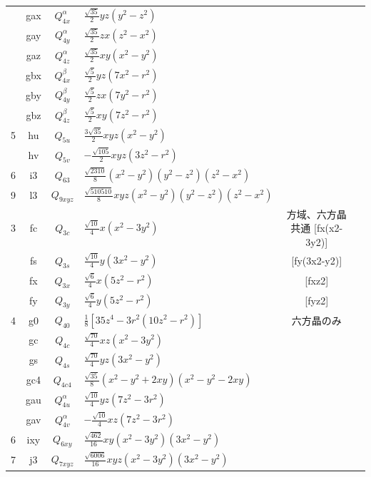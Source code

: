 \documentclass[11pt]{easymemo}
\begin{document}
\begin{table}[ht!]
\begin{center}
\begin{tabular}{ccclcc}
& gax & $Q_{4x}^\alpha$ & $\frac{\sqrt{35}}{2}yz(y^2-z^2)$ & \\
& gay & $Q_{4y}^\alpha$ & $\frac{\sqrt{35}}{2}zx(z^2-x^2)$ & \\
& gaz & $Q_{4z}^\alpha$ & $\frac{\sqrt{35}}{2}xy(x^2-y^2)$ & \\
& gbx & $Q_{4x}^\beta$ & $\frac{\sqrt{5}}{2}yz(7x^2-r^2)$ & \\
& gby & $Q_{4y}^\beta$ & $\frac{\sqrt{5}}{2}zx(7y^2-r^2)$ & \\
& gbz & $Q_{4z}^\beta$ & $\frac{\sqrt{5}}{2}xy(7z^2-r^2)$ & \\
5 & hu & $Q_{5u}$ & $\frac{3\sqrt{35}}{2}xyz(x^2-y^2)$ & \\
& hv & $Q_{5v}$ & $-\frac{\sqrt{105}}{2}xyz(3z^2-r^2)$ & \\
6 & i3 & $Q_{63}$ & $\frac{\sqrt{2310}}{8}(x^2-y^2)(y^2-z^2)(z^2-x^2)$ & \\
9 & l3 & $Q_{9xyz}$ & $\frac{\sqrt{510510}}{8}xyz(x^2-y^2)(y^2-z^2)(z^2-x^2)$ & \\ \hline
3 & fc & $Q_{3c}$ & $\frac{\sqrt{10}}{4}x(x^2-3y^2)$ & 方域、六方晶共通 [fx(x2-3y2)] \\
& fs & $Q_{3s}$ & $\frac{\sqrt{10}}{4}y(3x^2-y^2)$ & [fy(3x2-y2)] \\
& fx & $Q_{3x}$ & $\frac{\sqrt{6}}{4}x(5z^2-r^2)$ & [fxz2] \\
& fy & $Q_{3y}$ & $\frac{\sqrt{6}}{4}y(5z^2-r^2)$ & [fyz2] \\ \hline
4 & g0 & $Q_{40}$ & $\frac{1}{8}[35z^4-3r^2(10z^2-r^2)]$ & 六方晶のみ \\
& gc & $Q_{4c}$ & $\frac{\sqrt{70}}{4}xz(x^2-3y^2)$ & \\
& gs & $Q_{4s}$ & $\frac{\sqrt{70}}{4}yz(3x^2-y^2)$ & \\
& gc4 & $Q_{4c4}$ & $\frac{\sqrt{35}}{8}(x^2-y^2+2xy)(x^2-y^2-2xy)$ & \\
& gau & $Q_{4u}^\alpha$ & $\frac{\sqrt{10}}{4}yz(7z^2-3r^2)$ & \\
& gav & $Q_{4v}^\alpha$ & $-\frac{\sqrt{10}}{4}xz(7z^2-3r^2)$ & \\
6 & ixy & $Q_{6xy}$ & $\frac{\sqrt{462}}{16}xy(x^2-3y^2)(3x^2-y^2)$ & \\
7 & j3 & $Q_{7xyz}$ & $\frac{\sqrt{6006}}{16}xyz(x^2-3y^2)(3x^2-y^2)$ & \\
\hline\hline
\end{tabular}
\end{center}
\end{table}
\end{document}
